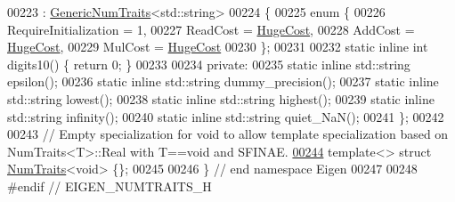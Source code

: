 \begin{DoxyCode}
00223   : \hyperlink{struct_eigen_1_1_generic_num_traits}{GenericNumTraits}<std::string>
00224 \{
00225   \textcolor{keyword}{enum} \{
00226     RequireInitialization = 1,
00227     ReadCost = \hyperlink{namespace_eigen_a3163430a1c13173faffde69016b48aaf}{HugeCost},
00228     AddCost  = \hyperlink{namespace_eigen_a3163430a1c13173faffde69016b48aaf}{HugeCost},
00229     MulCost  = \hyperlink{namespace_eigen_a3163430a1c13173faffde69016b48aaf}{HugeCost}
00230   \};
00231 
00232   \textcolor{keyword}{static} \textcolor{keyword}{inline} \textcolor{keywordtype}{int} digits10() \{ \textcolor{keywordflow}{return} 0; \}
00233 
00234 \textcolor{keyword}{private}:
00235   \textcolor{keyword}{static} \textcolor{keyword}{inline} std::string epsilon();
00236   \textcolor{keyword}{static} \textcolor{keyword}{inline} std::string dummy\_precision();
00237   \textcolor{keyword}{static} \textcolor{keyword}{inline} std::string lowest();
00238   \textcolor{keyword}{static} \textcolor{keyword}{inline} std::string highest();
00239   \textcolor{keyword}{static} \textcolor{keyword}{inline} std::string infinity();
00240   \textcolor{keyword}{static} \textcolor{keyword}{inline} std::string quiet\_NaN();
00241 \};
00242 
00243 \textcolor{comment}{// Empty specialization for void to allow template specialization based on NumTraits<T>::Real with T==void
       and SFINAE.}
\hyperlink{struct_eigen_1_1_num_traits_3_01void_01_4}{00244} \textcolor{keyword}{template}<> \textcolor{keyword}{struct }\hyperlink{group___core___module_struct_eigen_1_1_num_traits}{NumTraits}<void> \{\};
00245 
00246 \} \textcolor{comment}{// end namespace Eigen}
00247 
00248 \textcolor{preprocessor}{#endif // EIGEN\_NUMTRAITS\_H}
\end{DoxyCode}

